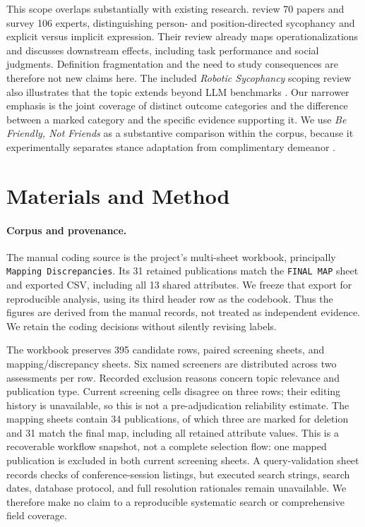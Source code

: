 \documentclass[letterpaper]{article}
\begin{document}
This scope overlaps substantially with existing research. \citet{ye2026taxonomy} review 70 papers and survey 106 experts, distinguishing person- and position-directed sycophancy and explicit versus implicit expression. Their review already maps operationalizations and discusses downstream effects, including task performance and social judgments. Definition fragmentation and the need to study consequences are therefore not new claims here. The included \emph{Robotic Sycophancy} scoping review also illustrates that the topic extends beyond LLM benchmarks \citep{10.1145/3776734.3794532}. Our narrower emphasis is the joint coverage of distinct outcome categories and the difference between a marked category and the specific evidence supporting it. We use \emph{Be Friendly, Not Friends} as a substantive comparison within the corpus, because it experimentally separates stance adaptation from complimentary demeanor \citep{10.1145/3772318.3791079}.

\section{Materials and Method}
\paragraph{Corpus and provenance.}
The manual coding source is the project's multi-sheet workbook, principally \texttt{Mapping Discrepancies}. Its 31 retained publications match the \texttt{FINAL MAP} sheet and exported CSV, including all 13 shared attributes. We freeze that export for reproducible analysis, using its third header row as the codebook. Thus the figures are derived from the manual records, not treated as independent evidence. We retain the coding decisions without silently revising labels.

The workbook preserves 395 candidate rows, paired screening sheets, and mapping/discrepancy sheets. Six named screeners are distributed across two assessments per row. Recorded exclusion reasons concern topic relevance and publication type. Current screening cells disagree on three rows; their editing history is unavailable, so this is not a pre-adjudication reliability estimate. The mapping sheets contain 34 publications, of which three are marked for deletion and 31 match the final map, including all retained attribute values. This is a recoverable workflow snapshot, not a complete selection flow: one mapped publication is excluded in both current screening sheets. A query-validation sheet records checks of conference-session listings, but executed search strings, search dates, database protocol, and full resolution rationales remain unavailable. We therefore make no claim to a reproducible systematic search or comprehensive field coverage.
\end{document}
